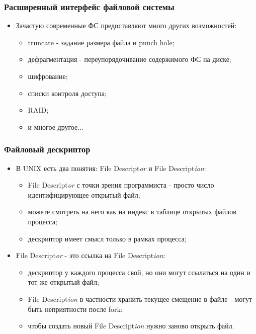 \begin{frame}
\frametitle{Расширенный интерфейс файловой системы}
\begin{itemize}
  \item Зачастую современные ФС предоставляют много других возможностей:
    \begin{itemize}
      \item truncate - задание размера файла и punch hole;
      \item дефрагментация - переупорядочивание содержимого ФС на диске;
      \item шифрование;
      \item списки контроля доступа;
      \item RAID;
      \item и многое другое...
    \end{itemize}
\end{itemize}
\end{frame}

\begin{frame}
\frametitle{Файловый дескриптор}
\begin{itemize}
  \item<1-> В UNIX есть два понятия: File Descript\emph{or} и File Descript\emph{ion}:
    \begin{itemize}
      \item File Descript\emph{or} с точки зрения программиста - просто число идентифицирующее открытый файл;
      \item можете смотреть на него как на индекс в таблице открытых файлов процесса;
      \item дескриптор имеет смысл только в рамках процесса;
    \end{itemize}
  \item<2-> File Descript\emph{or} - это ссылка на File Descript\emph{ion}:
    \begin{itemize}
      \item дескриптор у каждого процесса свой, но они могут ссылаться на один и тот же открытый файл;
      \item File Descript\emph{ion} в частности хранить текущее смещение в файле - могут быть неприятности после fork;
      \item чтобы создать новый File Descript\emph{ion} нужно заново открыть файл.
    \end{itemize}
\end{itemize}
\end{frame}


